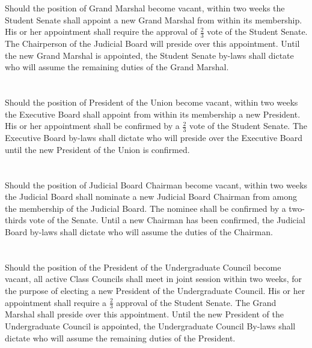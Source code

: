 
\section{}
Should the position of Grand Marshal become vacant, within two weeks the Student Senate shall
appoint a new Grand Marshal from within its membership. His or her appointment shall require the
approval of $\frac{2}{3}$ vote of the Student Senate. The Chairperson of the Judicial Board will preside over this
appointment. Until the new Grand Marshal is appointed, the Student Senate by-laws shall dictate who
will assume the remaining duties of the Grand Marshal.

\section{}
Should the position of President of the Union become vacant, within two weeks the Executive Board
shall appoint from within its membership a new President. His or her appointment shall be confirmed
by a $\frac{2}{3}$ vote of the Student Senate. The Executive Board by-laws shall dictate who will preside over the
Executive Board until the new President of the Union is confirmed.

\section{}
Should the position of Judicial Board Chairman become vacant, within two weeks the Judicial Board shall
nominate a new Judicial Board Chairman from among the membership of the Judicial Board. The
nominee shall be confirmed by a two-thirds vote of the Senate. Until a new Chairman has been
confirmed, the Judicial Board by-laws shall dictate who will assume the duties of the Chairman.

\section{}
Should the position of the President of the Undergraduate Council become vacant, all active Class
Councils shall meet in joint session within two weeks, for the purpose of electing a new President of the
Undergraduate Council. His or her appointment shall require a $\frac{2}{3}$ approval of the Student Senate. The
Grand Marshal shall preside over this appointment. Until the new President of the Undergraduate
Council is appointed, the Undergraduate Council By-laws shall dictate who will assume the remaining
duties of the President.

